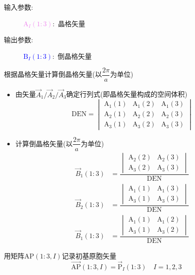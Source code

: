 \documentclass{article}      %
\begin{document}
\vskip 30pt
\begin{description}
	\item[输入参数:~] \textcolor{violet}{$\mathrm{A}_I(1:3)$}:~晶格矢量
	\item[输出参数:~] \textcolor{blue}{$\mathrm{B}_I(1:3)$}:~倒晶格矢量
\end{description}
根据晶格矢量计算倒晶格矢量(以$\dfrac{2\pi}a$为单位)
\begin{itemize}
	\item 由矢量$\vec A_1/\vec A_2/\vec A_3$确定行列式(即晶格矢量构成的空间体积)
		\begin{displaymath}
			\mathrm{DEN}=
			\begin{vmatrix}
				\mathrm{A}_1(1) &\mathrm{A}_1(2) &\mathrm{A}_1(3)\\
				\mathrm{A}_2(1) &\mathrm{A}_2(2) &\mathrm{A}_2(3)\\
				\mathrm{A}_3(1) &\mathrm{A}_3(2) &\mathrm{A}_3(3)
			\end{vmatrix}
		\end{displaymath}
	\item 计算倒晶格矢量(以$\dfrac{2\pi}a$为单位) 
\begin{displaymath}
	\begin{aligned}
		\vec B_1(1:3)&=\dfrac{
			\begin{vmatrix}
				\mathrm{A}_2(2) &\mathrm{A}_2(3)\\
				\mathrm{A}_3(2) &\mathrm{A}_3(3)
			\end{vmatrix}
		}{\mathrm{DEN}}	\\
		\vec B_2(1:3)&=\dfrac{
			\begin{vmatrix}
				\mathrm{A}_1(1) &\mathrm{A}_1(3)\\
				\mathrm{A}_3(1) &\mathrm{A}_3(3)
			\end{vmatrix}
		}{\mathrm{DEN}}	\\
		\vec B_1(1:3)&=\dfrac{
			\begin{vmatrix}
				\mathrm{A}_1(1) &\mathrm{A}_1(2)\\
				\mathrm{A}_3(1) &\mathrm{A}_3(2)
			\end{vmatrix}
		}{\mathrm{DEN}}
	\end{aligned}
\end{displaymath}
\end{itemize}

\vskip 50pt
用矩阵$\mathrm{AP}(1:3,I)$记录初基原胞矢量
\begin{displaymath}
		\vec{\mathrm{AP}}(1:3,I)=\vec{\mathrm P}_I(1:3)\quad I=1,2,3
\end{displaymath}
\end{document}
